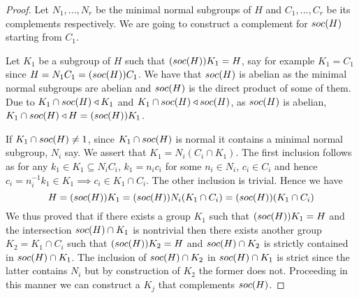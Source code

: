 \begin{proof}
Let $N_1,...,N_r$ be the minimal normal subgroups of $H$ and $C_1,...,C_r$ be its complements respectively. We are going to construct a complement for $soc {(H)}$ starting from $C_1$.

Let $K_1$ be a subgroup of $H$ such that $(soc {(H)})K_1 = H$, say for example $K_1 = C_1$ since $H = N_1C_1 = (soc {(H)})C_1$.
We have that $soc {(H)}$ is abelian as the minimal normal subgroups are abelian and $soc {(H)}$ is the direct product of some of them.
Due to $K_1 \cap soc {(H)} \triangleleft K_1$ and $K_1 \cap soc {(H)} \triangleleft soc {(H)}$, as $soc {(H)}$ is abelian, $K_1 \cap soc {(H)} \triangleleft H = (soc {(H)}) K_1$.

If $K_1 \cap soc {(H)} \ne 1$, since $K_1 \cap soc {(H)}$ is normal it contains a minimal normal subgroup, $N_i$ say.
We assert that $K_1 = N_i(C_i \cap K_1)$. The first inclusion follows as for any $k_1 \in K_1 \subseteq N_iC_i$, $k_1 = n_ic_i$ for some $n_i \in N_i$, $c_i \in C_i$ and hence $c_i = n_i^{-1}k_1 \in K_1 \implies c_i \in K_1 \cap C_i$. The other inclusion is trivial. Hence we have
$$
H = (soc {(H)}) K_1 = (soc {(H)}) N_i(K_1 \cap C_i) = (soc {(H)}) (K_1 \cap C_i)
$$
We thus proved that if there exists a group $K_1$ such that $(soc {(H)}) K_1 = H$ and the intersection $soc {(H)} \cap K_1$ is nontrivial then there exists another group $K_2 = K_1 \cap C_i$ such that $(soc {(H)}) K_2 = H$ and $soc {(H)} \cap K_2$ is strictly contained in $soc {(H)} \cap K_1$. The inclusion of $soc {(H)} \cap K_2$ in $soc {(H)} \cap K_1$ is strict since the latter contains $N_i$ but by construction of $K_2$ the former does not. Proceeding in this manner we can construct a $K_j$ that complements $soc {(H)}$.

\end{proof}